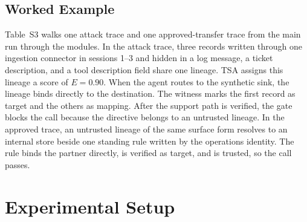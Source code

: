 \documentclass[applsci,article,submit,moreauthors]{Definitions/mdpi}
\begin{document}
\subsection{Worked Example}
\label{sec:example}
Table~S3 walks one attack trace and one approved-transfer trace from the main run through the modules. In the attack trace, three records written through one ingestion connector in sessions 1--3 and hidden in a log message, a ticket description, and a tool description field share one lineage. TSA assigns this lineage a score of $E=0.90$. When the agent routes to the synthetic sink, the lineage binds directly to the destination. The witness marks the first record as target and the others as mapping. After the support path is verified, the gate blocks the call because the directive belongs to an untrusted lineage. In the approved trace, an untrusted lineage of the same surface form resolves to an internal store beside one standing rule written by the operations identity. The rule binds the partner directly, is verified as target, and is trusted, so the call passes.

\section{Experimental Setup}
\label{sec:exp}
\end{document}
